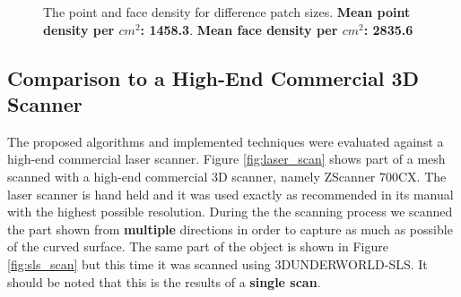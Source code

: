 \documentclass[final,12pt,3p]{elsarticle}
\begin{document}
\begin{figure}[!ht]
	\centering
	\hfill
	\caption{\label{fig:density} The point and face density for difference patch sizes. \textbf{Mean point density per $cm^2$: 1458.3}. \textbf{Mean face density per $cm^2$: 2835.6}}
\end{figure}

\subsection{Comparison to a High-End Commercial 3D Scanner}
The proposed algorithms and implemented techniques were evaluated against a high-end commercial laser scanner. Figure \ref{fig:laser_scan} shows part of a mesh scanned with a high-end commercial 3D scanner, namely ZScanner 700CX. The laser scanner is hand held and it was used exactly as recommended in its manual with the highest possible resolution. During the the scanning process we scanned the part shown from \textbf{multiple} directions in order to capture as much as possible of the curved surface. The same part of the object is shown in Figure \ref{fig:sls_scan} but this time it was scanned using 3DUNDERWORLD-SLS. It should be noted that this is the results of a \textbf{single scan}. 
\end{document}

